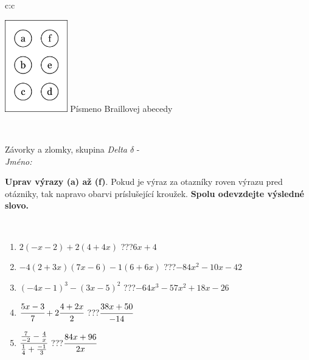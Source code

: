 \documentclass[10pt]{report}
\begin{document}
\begin{tabular}{c:c}
\begin{minipage}[c][104.5mm][t]{0.5\linewidth}
\begin{center}
\begin{minipage}{0.20\linewidth}
\begin{center}
\includegraphics[height=40mm]{../images/braille.png}
{\small Písmeno Braillovej abecedy}
\end{center}
\end{minipage}
\end{center}
\end{minipage}
\\ \hdashline
\begin{minipage}[c][104.5mm][t]{0.5\linewidth}
\begin{center}
\vspace{7mm}
{\huge Závorky a zlomky, skupina \textit{Delta $\delta$} -}\\[5mm]
\textit{Jméno:}\phantom{xxxxxxxxxxxxxxxxxxxxxxxxxxxxxxxxxxxxxxxxxxxxxxxxxxxxxxxxxxxxxxxxx}\\[5mm]
\begin{minipage}{0.95\linewidth}
\begin{center}
\textbf{Uprav výrazy (a) až (f)}. Pokud je výraz za otazníky roven výrazu pred otázniky, tak napravo obarvi príslušející kroužek. \textbf{Spolu odevzdejte výsledné slovo.}
\end{center}
\end{minipage}
\\[1mm]
\begin{minipage}{0.79\linewidth}
\begin{center}
\begin{varwidth}{\linewidth}
\begin{enumerate}
\normalsize
\item $2(-x-2)+2(4+4x)$\quad \dotfill\; ???\;\dotfill \quad $6x+4$
\item $-4(2+3x)(7x-6)-1(6+6x)$\quad \dotfill\; ???\;\dotfill \quad $-84x^2-10x-42$
\item $(-4x-1)^3-(3x-5)^2$\quad \dotfill\; ???\;\dotfill \quad $-64x^3-57x^2+18x-26$
\item $\cfrac{5x-3}{7}+2\cfrac{4+2x}{2}$\quad \dotfill\; ???\;\dotfill \quad $\cfrac{38x+50}{-14}$
\item $\cfrac{\frac{7}{-2}-\frac{4}{x}}{\frac{1}{4}+\frac{-1}{3}}$\quad \dotfill\; ???\;\dotfill \quad $\cfrac{84x+96}{2x}$

\end{enumerate}
\end{varwidth}
\end{center}
\end{minipage}
\end{center}
\end{minipage}
\end{tabular}
\end{document}
